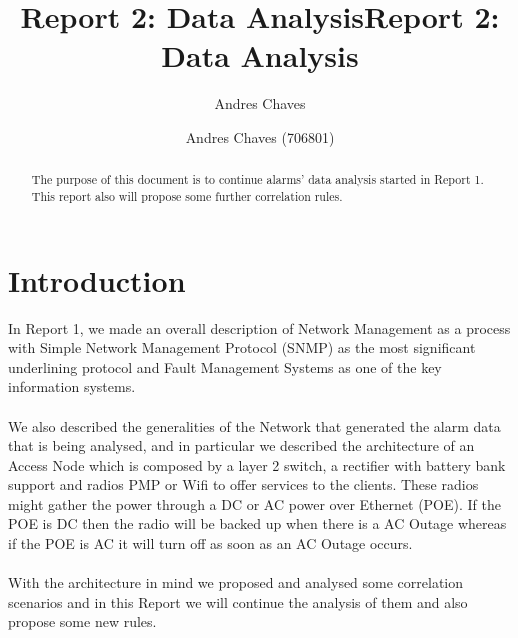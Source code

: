 \documentclass[10pt,a4paper]{article}
\author{Andres Chaves}
\title{Report 2: Data Analysis}
\begin{document}
 \title{Report 2: Data Analysis}
 \author{Andres Chaves (706801) \\
  }
 \maketitle
 
 \begin{abstract}
    The purpose of this document is to continue alarms' data analysis started in Report 1. This report also will propose some further correlation rules.
\end{abstract}

 \section*{Introduction}
In Report 1, we made an overall description of Network Management as a process with Simple Network Management Protocol (SNMP) as the most significant underlining protocol and Fault Management Systems as one of the key information systems.
\\\\
We also described the generalities of the Network that generated the alarm data that is being analysed, and in particular we described the architecture of an Access Node which is composed by a layer 2 switch, a rectifier with battery bank support and radios PMP or Wifi to offer services to the clients. These radios might gather the power through a DC or AC power over Ethernet (POE). If the POE is DC then the radio will be backed up when there is a AC Outage whereas if the POE is AC it will turn off as soon as an AC Outage occurs.
\\\\
With the architecture in mind we proposed and analysed some correlation scenarios and in this Report we will continue the analysis of them and also propose some new rules.
\end{document}
